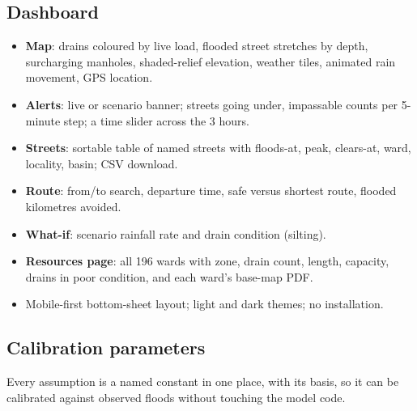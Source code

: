\documentclass[11pt,a4paper]{article}
\begin{document}
\subsection{Dashboard}

\begin{itemize}
  \item \textbf{Map}: drains coloured by live load, flooded street stretches by depth,
        surcharging manholes, shaded-relief elevation, weather tiles, animated rain
        movement, GPS location.
  \item \textbf{Alerts}: live or scenario banner; streets going under, impassable
        counts per 5-minute step; a time slider across the 3 hours.
  \item \textbf{Streets}: sortable table of named streets with floods-at, peak, clears-at,
        ward, locality, basin; CSV download.
  \item \textbf{Route}: from/to search, departure time, safe versus shortest route,
        flooded kilometres avoided.
  \item \textbf{What-if}: scenario rainfall rate and drain condition (silting).
  \item \textbf{Resources page}: all 196 wards with zone, drain count, length, capacity,
        drains in poor condition, and each ward's base-map PDF.
  \item Mobile-first bottom-sheet layout; light and dark themes; no installation.
\end{itemize}

\subsection{Calibration parameters}
\label{sec:params}
Every assumption is a named constant in one place, with its basis, so it can be
calibrated against observed floods without touching the model code.
\end{document}
